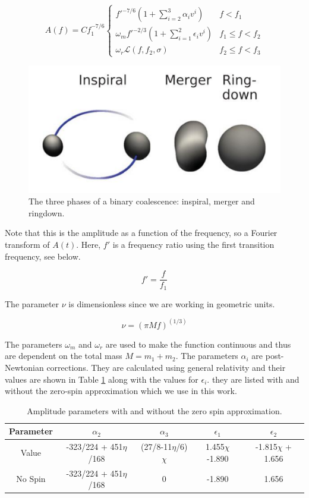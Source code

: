 \[ A(f) = C f_1^{-7/6} \begin{cases}
        f'^{-7/6}(1+ \sum_{i=2}^3\alpha_i v^i) & f<f_1 \\
        \omega_m f'^{-2/3}(1+ \sum_{i=1}^2 \epsilon_i v^i) & f_1 \leq f < f_2 \\
        \omega_r \mathcal{L}(f, f_2, \sigma) & f_2 \leq f < f_3
\end{cases}
\]

\begin{figure}
    \centering
    \includegraphics[width=0.5\linewidth]{Images/IMR_figure.png}
    \caption{The three phases of a binary coalescence: inspiral, merger and ringdown.}
    \label{IMR_figure}
\end{figure} 

Note that this is the amplitude as a function of the frequency, so a Fourier transform of $A(t)$.
Here, $f'$ is a frequency ratio using the first transition frequency, see below. 

\begin{equation}
    f'=\frac{f}{f_1}
\end{equation}

The parameter $\nu$ is dimensionless since we are working in geometric units.

\begin{equation}
    \nu=(\pi M f)^(1/3)
\end{equation}

The parameters $\omega_m$ and $\omega_r$ are used to make the function continuous and thus are dependent on the total mass $M=m_1+m_2$. The parameters $\alpha_i$ are post-Newtonian corrections. They are calculated using general relativity and their values are shown in Table \ref{amplitude_param} along with the values for $\epsilon_i$. they are listed with and without the zero-spin approximation which we use in this work.

\begin{table}[h]
    \begin{center}
        \begin{tabular}{ c | c | c | c | c}
            Parameter & $\alpha_2$ & $\alpha_3$ & $\epsilon_1$ & $\epsilon_2$ \\
            \hline
            Value & -323/224 + 451$\eta$/168 & (27/8-11$\eta$/6)$\chi$ & 1.455$\chi$-1.890 & -1.815$\chi$ + 1.656\\
            \hline
            No Spin & -323/224 +  451$\eta$/168 & 0 & -1.890 & 1.656 
        \end{tabular}
        \caption{Amplitude parameters with and without the zero spin approximation.}
        \label{amplitude_param}
    \end{center}
\end{table}

